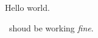 \documentclass{article}
\begin{document}
Hello world.\par
\LaTedsaX~shoud be working \emph{fine}.
\end{document}
